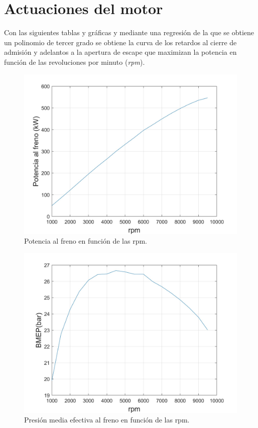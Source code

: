 \section{Actuaciones del motor} \label{s:section_06}
Con las siguientes tablas y gráficas y mediante una regresión de la que se obtiene un polinomio de tercer grado se obtiene la curva de los retardos al cierre de admisión y adelantos a la apertura de escape que maximizan la potencia en función de las revoluciones por minuto (\textit{rpm}).

\begin{figure}[H]
    \centering
    \includegraphics[width=0.6\linewidth]{Figures/01/Potencia_rpm.jpg}
    \caption{Potencia al freno en función de las rpm.}
    \label{fig:RPM_pot}
\end{figure}

\begin{figure}[H]
    \centering
    \includegraphics[width=0.6\linewidth]{Figures/01/BMEP.jpg}
    \caption{Presión media efectiva al freno en función de las rpm.}
    \label{fig:RPM_bmep}
\end{figure}

